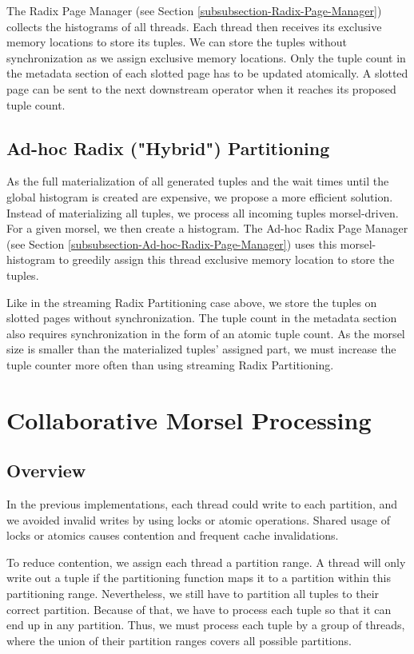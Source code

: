 The Radix Page Manager (see Section \ref{subsubsection-Radix-Page-Manager}) collects the histograms of all threads.
Each thread then receives its exclusive memory locations to store its tuples.
We can store the tuples without synchronization as we assign exclusive memory locations.
Only the tuple count in the metadata section of each slotted page has to be updated atomically.
A slotted page can be sent to the next downstream operator when it reaches its proposed tuple count.

\subsection{Ad-hoc Radix ("Hybrid") Partitioning}
As the full materialization of all generated tuples and the wait times until the global histogram is created are expensive, we propose a more efficient solution.
Instead of materializing all tuples, we process all incoming tuples morsel-driven.
For a given morsel, we then create a histogram.
The Ad-hoc Radix Page Manager (see Section \ref{subsubsection-Ad-hoc-Radix-Page-Manager}) uses this morsel-histogram to greedily assign this thread exclusive memory location to store the tuples.

Like in the streaming Radix Partitioning case above, we store the tuples on slotted pages without synchronization.
The tuple count in the metadata section also requires synchronization in the form of an atomic tuple count.
As the morsel size is smaller than the materialized tuples' assigned part, we must increase the tuple counter more often than using streaming Radix Partitioning.

\section{Collaborative Morsel Processing}\label{section-Collaborative-Morsel-Processing}
\subsection{Overview}
In the previous implementations, each thread could write to each partition, and we avoided invalid writes by using locks or atomic operations.
Shared usage of locks or atomics causes contention and frequent cache invalidations.

To reduce contention, we assign each thread a partition range.
A thread will only write out a tuple if the partitioning function maps it to a partition within this partitioning range.
Nevertheless, we still have to partition all tuples to their correct partition.
Because of that, we have to process each tuple so that it can end up in any partition.
Thus, we must process each tuple by a group of threads, where the union of their partition ranges covers all possible partitions.
